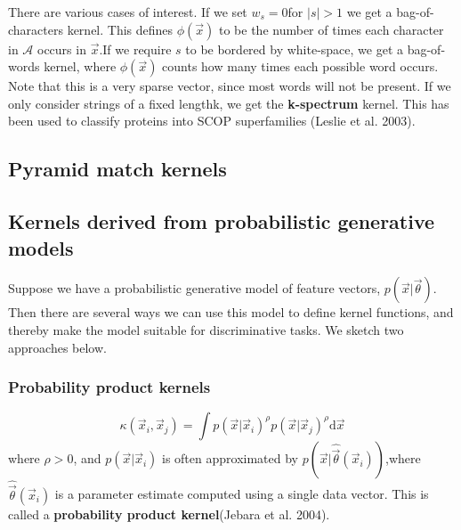There are various cases of interest. If we set $w_s =0$for $|s| >1$ we get a bag-of-characters kernel. This defines $\phi(\vec{x})$ to be the number of times each character in $\mathcal{A}$ occurs in $\vec{x}$.If we require $s$ to be bordered by white-space, we get a bag-of-words kernel, where $\phi(\vec{x})$ counts how many times each possible word occurs. Note that this is a very sparse vector, since most words will not be present. If we only consider strings of a fixed lengthk, we get the \textbf{k-spectrum} kernel. This has been used to classify proteins into SCOP superfamilies (Leslie et al. 2003).


\subsection{Pyramid match kernels}


\subsection{Kernels derived from probabilistic generative models}
Suppose we have a probabilistic generative model of feature vectors, $p(\vec{x}|\vec{\theta})$. Then there are several ways we can use this model to define kernel functions, and thereby make the model suitable for discriminative tasks. We sketch two approaches below.


\subsubsection{Probability product kernels}
\begin{equation}\label{eqn:Probability-product-kernels}
\kappa(\vec{x}_i,\vec{x}_j)=\int p(\vec{x}|\vec{x}_i)^{\rho}p(\vec{x}|\vec{x}_j)^{\rho}\mathrm{d}\vec{x}
\end{equation}
where $\rho>0$, and $p(\vec{x}|\vec{x}_i)$ is often approximated by $p(\vec{x}|\hat{\vec{\theta}}(\vec{x}_i))$,where $\hat{\vec{\theta}}(\vec{x}_i)$ is a parameter estimate computed using a single data vector. This is called a \textbf{probability product kernel}(Jebara et al. 2004).

